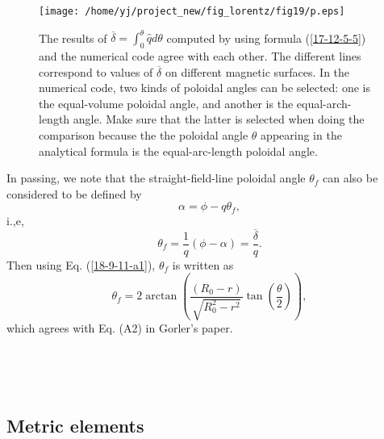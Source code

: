 \documentclass{article}
\begin{document}
\begin{figure}[h]
  \texttt{[image: /home/yj/project\_new/fig\_lorentz/fig19/p.eps]}
  \caption{\label{17-12-5-8}The results of $\overline{\delta} =
  \int_0^{\theta} \hat{q} d \theta$ computed by using formula
  (\ref{17-12-5-5}) and the numerical code agree with each other. The
  different lines correspond to values of $\overline{\delta}$ on different
  magnetic surfaces. In the numerical code, two kinds of poloidal angles can
  be selected: one is the equal-volume poloidal angle, and another is the
  equal-arch-length angle. Make sure that the latter is selected when doing
  the comparison because the the poloidal angle $\theta$ appearing in the
  analytical formula is the equal-arc-length poloidal angle.}
\end{figure}

In passing, we note that the straight-field-line poloidal angle $\theta_f$ can
also be considered to be defined by
\begin{equation}
  \alpha = \phi - q \theta_f,
\end{equation}
i.,e,
\begin{equation}
  \theta_f = \frac{1}{q} (\phi - \alpha) = \frac{\overline{\delta}}{q} .
\end{equation}
Then using Eq. (\ref{18-9-11-a1}), $\theta_f$ is written as
\begin{equation}
  \theta_f = 2 \arctan \left( \frac{(R_0 - r)}{\sqrt{R_0^2 - r^2}} \tan \left(
  \frac{\theta}{2} \right) \right),
\end{equation}
which agrees with Eq. (A2) in Gorler's paper{\cite{gorler2016}}.

\

\

\subsection{Metric elements}
\end{document}
